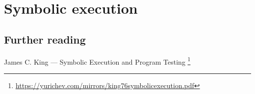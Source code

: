 \section{Symbolic execution}




\subsection{Further reading}

James C. King --- Symbolic Execution and Program Testing
\footnote{\url{https://yurichev.com/mirrors/king76symbolicexecution.pdf}}

